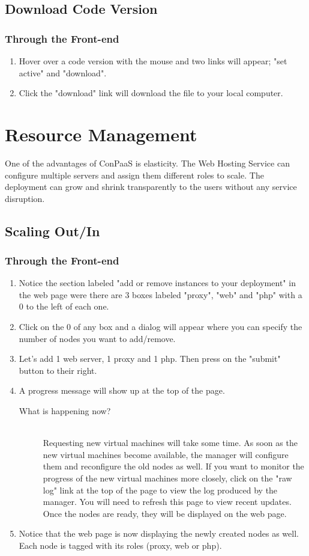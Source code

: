 \documentclass[10pt]{article}
\newenvironment{what}
{\begin{description} \item [What is happening now?] \hfill \\}
{\end{description}}
\begin{document}
\subsection{Download Code Version}
\subsubsection{Through the Front-end}
\begin{enumerate}
\item Hover over a code version with the mouse and two links will appear;
      "set active" and "download".
\item Click the "download" link will download the file to your local computer.
\end{enumerate}

\section{Resource Management}
One of the advantages of ConPaaS is elasticity. The Web Hosting Service can
configure multiple servers and assign them different roles to scale. The
deployment can grow and shrink transparently to the users without any
service disruption.

\subsection{Scaling Out/In}
\subsubsection{Through the Front-end}
\begin{enumerate}
\item Notice the section labeled "add or remove instances to your deployment" in
      the web page were there are 3 boxes labeled "proxy", "web" and "php" with
      a 0 to the left of each one.
\item Click on the 0 of any box and a dialog will appear where you can specify
the number of nodes you want to add/remove.
\item Let's add 1 web server, 1 proxy and 1 php. Then press on the "submit"
      button to their right.
\item A progress message will show up at the top of the page.
 \begin{what}
  Requesting new virtual machines will take some time. As soon as the new
  virtual machines become available, the manager will configure them and
  reconfigure the old nodes as well. If you want to monitor the progress of the
  new virtual machines more closely, click on the "raw log" link at the top of
  the page to view the log produced by the manager. You will need to refresh
  this page to view recent updates. Once the nodes are ready, they will be
  displayed on the web page.
 \end{what}
\item Notice that the web page is now displaying the newly created nodes as
      well. Each node is tagged with its roles (proxy, web or php).
\end{enumerate}
\end{document}

